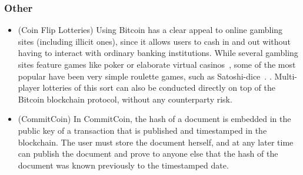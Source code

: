 \subsubsection{Other}
\begin{itemize}
\item (Coin Flip Lotteries) Using Bitcoin has a clear appeal to online gambling sites (including illicit ones), since it allows users to cash in and out without having to interact with ordinary banking institutions. While several gambling sites feature games like poker or elaborate virtual casinos~, some of the most popular have been very simple roulette games, such as Satoshi-dice~. . Multi-player lotteries of this sort can also be conducted directly on top of the Bitcoin blockchain protocol, without any counterparty risk.~\cite{fairmultiparty}
\item (CommitCoin) In CommitCoin, the hash of a document is embedded in the public key of a transaction that is published and timestamped in the blockchain. The user must store the document herself, and at any later time can publish the document and prove to anyone else that the hash of the document was known previously to the timestamped date.~\cite{commitcoin}
\end{itemize}

\newcommand{\riskpower}{K}
\newcommand{\overall}[1]{{~[ {#1} ]}}
\newcommand{\Oh}[1]{{#1}}


